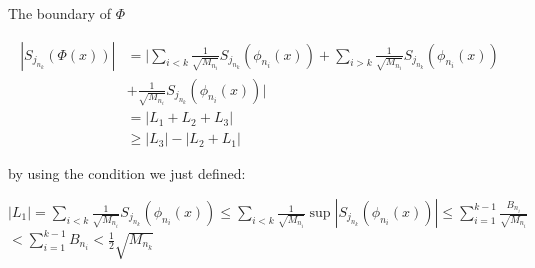 \documentclass{beamer}
\begin{document}
\begin{frame}{The boundary of $ \Phi $}
    \begin{block}{}
        \begin{align*}
            |S_{j_{n_k}}(\Phi(x))|&=|\sum_{i<k}\frac{1}{\sqrt{M_{n_i}}}S_{j_{n_k}}(\phi_{n_i}(x))+\sum_{i>k}\frac{1}{\sqrt{M_{n_i}}}S_{j_{n_k}}(\phi_{n_i}(x))\\
            &+\frac{1}{\sqrt{M_{n_i}}}S_{j_{n_k}}(\phi_{n_i}(x))|\\
            &=|L_1+L_2+L_3|\\
            &\geqslant |L_3| -|L_2+L_1|
        \end{align*}
    \end{block}

    by using the condition we just defined:
    \begin{block}{}
        
        $ |L_1|= \sum_{i<k}\frac{1}{\sqrt{M_{n_i}}}S_{j_{n_k}}(\phi_{n_i}(x)) \leqslant \sum_{i<k}\frac{1}{\sqrt{M_{n_i}}}\sup|S_{j_{n_k}}\left(\phi_{n_i}\left(x\right)\right)| \leqslant \sum_{i=1}^{k-1}\frac{B_{n_i}}{\sqrt{M_{n_i}}}$
$<\sum_{i=1}^{k-1}B_{n_i}<\frac{1}{2}\sqrt{M_{n_k}}$
    \end{block}
\end{frame}
\end{document}
